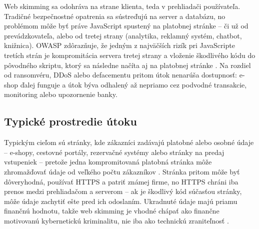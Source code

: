 Web skimming sa odohráva na strane klienta, teda v prehliadači používateľa. Tradičné bezpečnostné opatrenia sa sústreďujú na server a databázu, no problémom môže byť práve JavaScript spustený na platobnej stránke -- či už od prevádzkovateľa, alebo od tretej strany (analytika, reklamný systém, chatbot, knižnica). OWASP zdôrazňuje, že jedným z najväčších rizík pri JavaScripte tretích strán je kompromitácia servera tretej strany a vloženie škodlivého kódu do pôvodného skriptu, ktorý sa následne načíta aj na platobnej stránke \cite{owaspThirdPartyJavascript,owaspClientSideTop10}. Na rozdiel od ransomvéru, DDoS alebo defacementu pritom útok nenarúša dostupnosť: e-shop ďalej funguje a útok býva odhalený až nepriamo cez podvodné transakcie, monitoring alebo upozornenie banky.

\subsection{Typické prostredie útoku}

Typickým cieľom sú stránky, kde zákazníci zadávajú platobné alebo osobné údaje -- e-shopy, cestovné portály, rezervačné systémy alebo stránky na predaj vstupeniek -- pretože jedna kompromitovaná platobná stránka môže zhromažďovať údaje od veľkého počtu zákazníkov \cite{europolDigitalSkimming}. Stránka pritom môže byť dôveryhodná, používať HTTPS a patriť známej firme, no HTTPS chráni iba prenos medzi prehliadačom a serverom -- ak je škodlivý kód súčasťou stránky, môže údaje zachytiť ešte pred ich odoslaním. Ukradnuté údaje majú priamu finančnú hodnotu, takže web skimming je vhodné chápať ako finančne motivovanú kybernetickú kriminalitu, nie iba ako technickú zraniteľnosť \cite{cisa2020eskimming,pciSsc2025PaymentPage,europolDigitalSkimming}.

